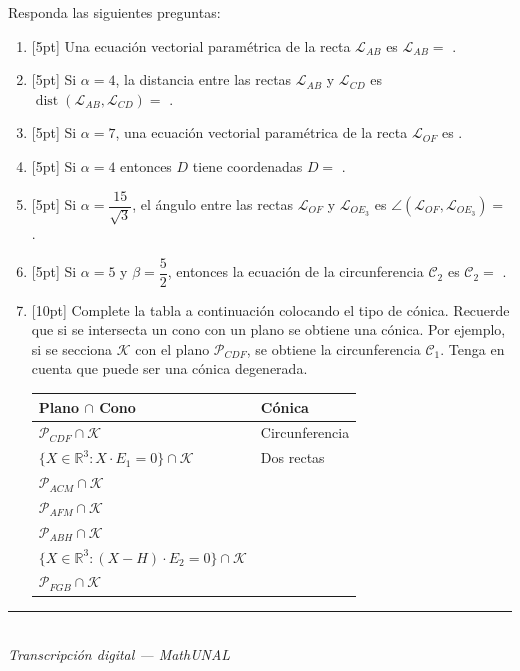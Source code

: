 \documentclass[11pt]{article}
\newcommand{\examfooter}{%
  \vfill
  \rule{\linewidth}{0.4pt}\\[1pt]
  {\scriptsize\textit{Transcripción digital --- MathUNAL}\hfill\textcolor{unalblue}{\textbf{\thepage}}}
}
\begin{document}
\begin{enumerate}
Responda las siguientes preguntas:

\begin{enumerate}[label=(\alph*)]
\item{}[5pt] Una ecuación vectorial paramétrica de la recta $\mathcal{L}_{AB}$ es $\mathcal{L}_{AB}=$ \underline{\hspace{3cm}}.
\item{}[5pt] Si $\alpha=4$, la distancia entre las rectas $\mathcal{L}_{AB}$ y $\mathcal{L}_{CD}$ es $\operatorname{dist}(\mathcal{L}_{AB},\mathcal{L}_{CD})=$ \underline{\hspace{3cm}}.
\item{}[5pt] Si $\alpha=7$, una ecuación vectorial paramétrica de la recta $\mathcal{L}_{OF}$ es \underline{\hspace{3cm}}.
\item{}[5pt] Si $\alpha=4$ entonces $D$ tiene coordenadas $D=$ \underline{\hspace{3cm}}.
\item{}[5pt] Si $\alpha=\dfrac{15}{\sqrt{3}}$, el ángulo entre las rectas $\mathcal{L}_{OF}$ y $\mathcal{L}_{OE_3}$ es $\angle(\mathcal{L}_{OF},\mathcal{L}_{OE_3})=$ \underline{\hspace{3cm}}.
\item{}[5pt] Si $\alpha=5$ y $\beta=\dfrac{5}{2}$, entonces la ecuación de la circunferencia $\mathcal{C}_2$ es $\mathcal{C}_2=$ \underline{\hspace{5cm}}.
\item{}[10pt] Complete la tabla a continuación colocando el tipo de cónica. Recuerde que si se intersecta un cono con un plano se obtiene una cónica. Por ejemplo, si se secciona $\mathcal{K}$ con el plano $\mathcal{P}_{CDF}$, se obtiene la circunferencia $\mathcal{C}_1$. Tenga en cuenta que puede ser una cónica degenerada.

\begin{center}
\begin{tabular}{|l|l|}
\hline
\textbf{Plano $\cap$ Cono} & \textbf{Cónica} \\
\hline
$\mathcal{P}_{CDF}\cap\mathcal{K}$ & Circunferencia \\
\hline
$\{X\in\mathbb{R}^3: X\cdot E_1=0\}\cap\mathcal{K}$ & Dos rectas \\
\hline
$\mathcal{P}_{ACM}\cap\mathcal{K}$ & \\
\hline
$\mathcal{P}_{AFM}\cap\mathcal{K}$ & \\
\hline
$\mathcal{P}_{ABH}\cap\mathcal{K}$ & \\
\hline
$\{X\in\mathbb{R}^3: (X-H)\cdot E_2=0\}\cap\mathcal{K}$ & \\
\hline
$\mathcal{P}_{FGB}\cap\mathcal{K}$ & \\
\hline
\end{tabular}
\end{center}
\end{enumerate}

\end{enumerate}

\examfooter
\end{document}
